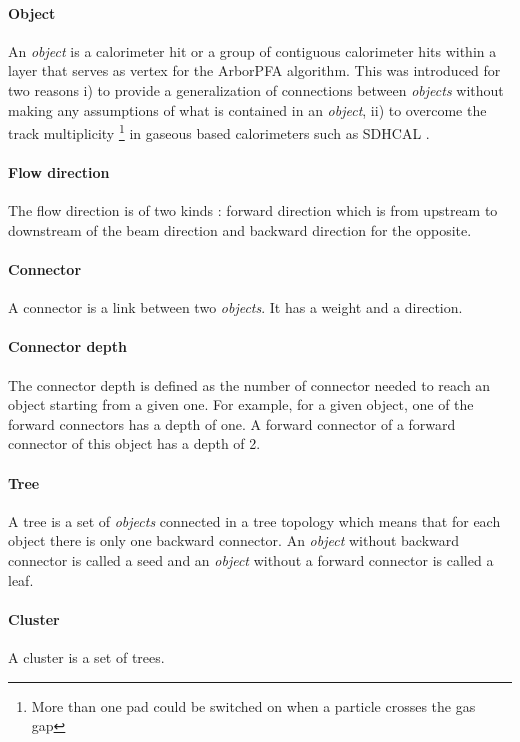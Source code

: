 \documentclass[cits]{JINST}
\begin{document}
\paragraph*{Object} An \textit{object} is a calorimeter hit or a group of contiguous calorimeter hits within a layer that serves as vertex for the ArborPFA algorithm. This was introduced for two reasons i) to provide a generalization of connections between \textit{objects} without making any assumptions of what is contained in an \textit{object}, ii) to overcome the track multiplicity \footnote{More than one pad could be switched on when a particle crosses the gas gap} in gaseous based calorimeters such as SDHCAL \cite{sdhcal-paper}.

\paragraph*{Flow direction} The flow direction is of two kinds : forward direction which is from upstream to downstream of the beam direction and backward direction for the opposite.

\paragraph*{Connector} A connector is a link between two \textit{objects}. It has a weight and a direction.

\paragraph*{Connector depth} The connector depth is defined as the number of connector needed to reach an object starting from a given one. For example, for a given object, one of the forward connectors has a depth of one. A forward connector of a forward connector of this object has a depth of 2.

\paragraph*{Tree} A tree is a set of \textit{objects} connected in a tree topology which means that for each object there is only one backward connector. An \textit{object} without backward connector is called a seed and an \textit{object} without a forward connector is called a leaf.

\paragraph*{Cluster} A cluster is a set of trees.
\end{document}
